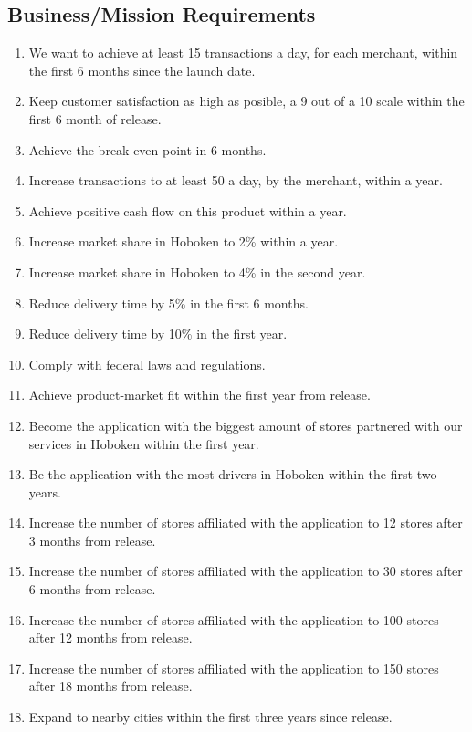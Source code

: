 \subsection{Business/Mission Requirements}
\begin{enumerate}[label=BR-\arabic*]
    \item We want to achieve at least 15 transactions a day, for each 
    merchant, within the first 6 months since the launch date.
    \item Keep customer satisfaction as high as posible, a 9 out of a 10 scale 
    within the first 6 month of release.
    \item Achieve the break-even point in 6 months.
    \item Increase transactions to at least 50 a day, by the merchant, 
    within a year.
    \item Achieve positive cash flow on this product within a year.
    \item Increase market share in Hoboken to 2\% within a year.
    \item Increase market share in Hoboken to 4\% in the second year.
    \item Reduce delivery time by 5\% in the first 6 months.
    \item Reduce delivery time by 10\% in the first year.
    \item Comply with federal laws and regulations.
    \item Achieve product-market fit \cite{product-market-fit} within the first 
    year from release.
    \item Become the application with the biggest amount of stores partnered 
    with our services in Hoboken within the first year.
    \item Be the application with the most drivers in Hoboken within the first 
    two years.
    \item Increase the number of stores affiliated with the application to 12 
    stores after 3 months from release.
    \item Increase the number of stores affiliated with the application to 30 
    stores after 6 months from release.
    \item Increase the number of stores affiliated with the application to 100 
    stores after 12 months from release.
    \item Increase the number of stores affiliated with the application to 150 
    stores after 18 months from release.
    \item Expand to nearby cities within the first three years since release.

\end{enumerate}
